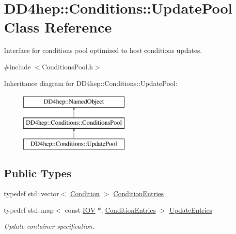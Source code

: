 \hypertarget{class_d_d4hep_1_1_conditions_1_1_update_pool}{}\section{D\+D4hep\+:\+:Conditions\+:\+:Update\+Pool Class Reference}
\label{class_d_d4hep_1_1_conditions_1_1_update_pool}


Interface for conditions pool optimized to host conditions updates.  




{\ttfamily \#include $<$Conditions\+Pool.\+h$>$}

Inheritance diagram for D\+D4hep\+:\+:Conditions\+:\+:Update\+Pool\+:\begin{figure}[H]
\begin{center}
\leavevmode
\includegraphics[height=3.000000cm]{class_d_d4hep_1_1_conditions_1_1_update_pool}
\end{center}
\end{figure}
\subsection*{Public Types}
\begin{DoxyCompactItemize}
\item 
typedef std\+::vector$<$ \hyperlink{class_d_d4hep_1_1_conditions_1_1_condition}{Condition} $>$ \hyperlink{class_d_d4hep_1_1_conditions_1_1_update_pool_ad6bcf36ae0a7dee0a08e1045d8612c6e}{Condition\+Entries}
\item 
typedef std\+::map$<$ const \hyperlink{class_d_d4hep_1_1_i_o_v}{I\+OV} $\ast$, \hyperlink{class_d_d4hep_1_1_conditions_1_1_update_pool_ad6bcf36ae0a7dee0a08e1045d8612c6e}{Condition\+Entries} $>$ \hyperlink{class_d_d4hep_1_1_conditions_1_1_update_pool_a1a578a7a025ded412da474be106dc780}{Update\+Entries}
\begin{DoxyCompactList}\small\item\em Update container specification. \end{DoxyCompactList}\end{DoxyCompactItemize}
